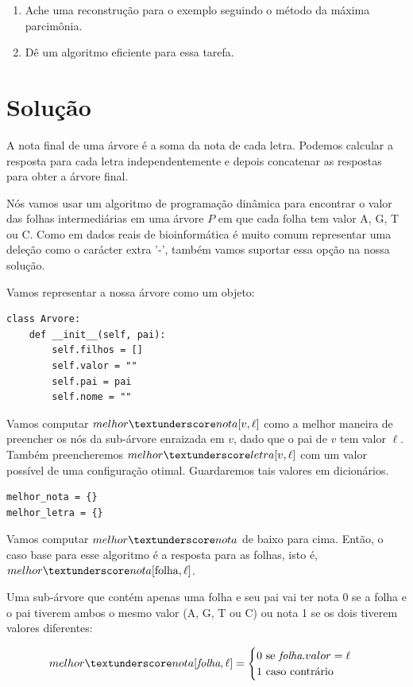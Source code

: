 \documentclass[11pt]{article}
\newcommand{\tu}{\textunderscore}
\begin{document}
\begin{enumerate}
\item Ache uma reconstrução para o exemplo seguindo o método da
máxima parcimônia.
\item Dê um algoritmo eficiente para essa tarefa.
\end{enumerate}

\section{Solução}
\label{sec-2}

A nota final de uma árvore é a soma da nota de cada letra. Podemos
calcular a resposta para cada letra independentemente e depois
concatenar as respostas para obter a árvore final.

Nós vamos usar um algoritmo de programação dinâmica para encontrar o
valor das folhas intermediárias em uma árvore $P$ em que cada folha
tem valor A, G, T ou C. Como em dados reais de bioinformática é muito
comum representar uma deleção como o carácter extra '-', também vamos
suportar essa opção na nossa solução.

Vamos representar a nossa árvore como um objeto:
\begin{verbatim}
class Arvore:
    def __init__(self, pai):
        self.filhos = []
        self.valor = ""
        self.pai = pai
        self.nome = ""
\end{verbatim}

Vamos computar $melhor\tu nota[v, \ell]$ como a melhor maneira de
preencher os nós da sub-árvore enraizada em $v$, dado que o pai de $v$
tem valor $\ell$. Também preencheremos $melhor \tu letra[v, \ell]$ com um valor possível
de uma configuração otimal. Guardaremos tais valores em dicionários.

\begin{verbatim}
melhor_nota = {}
melhor_letra = {}
\end{verbatim}

Vamos computar $melhor \tu nota$ de baixo para cima. Então, o caso base
para esse algoritmo é a resposta para as folhas, isto é, $melhor\tu nota[\mathrm{folha}, \ell]$.

Uma sub-árvore que contém apenas uma folha e seu pai vai ter
nota 0 se a folha e o pai tiverem ambos o mesmo valor (A,
G, T ou C) ou nota 1 se os dois tiverem valores diferentes:

\[melhor \tu nota[\textit{folha}, \ell] = \begin{cases}0 \text{ se } \textit{folha}.valor = \ell \\
                                                       1 \text{ caso contrário}\end{cases}\]
\end{document}

